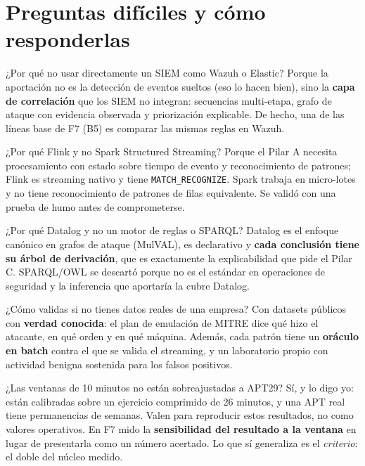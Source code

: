 \documentclass[11pt,a4paper]{article}
\newcommand{\cod}[1]{\texttt{#1}}
\begin{document}
\newpage
\section{Preguntas difíciles y cómo responderlas}\label{sec:preguntas}

\begin{pregunta}{¿Por qué no usar directamente un SIEM como Wazuh o Elastic?}
Porque la aportación no es la detección de eventos sueltos (eso lo hacen bien), sino la \textbf{capa de
correlación} que los SIEM no integran: secuencias multi-etapa, grafo de ataque con evidencia observada y
priorización explicable. De hecho, una de las líneas base de F7 (B5) es comparar las mismas reglas en Wazuh.
\end{pregunta}

\begin{pregunta}{¿Por qué Flink y no Spark Structured Streaming?}
Porque el Pilar A necesita procesamiento con estado sobre tiempo de evento y reconocimiento de patrones; Flink es
streaming nativo y tiene \cod{MATCH\_RECOGNIZE}. Spark trabaja en micro-lotes y no tiene reconocimiento de patrones de
filas equivalente. Se validó con una prueba de humo antes de comprometerse.
\end{pregunta}

\begin{pregunta}{¿Por qué Datalog y no un motor de reglas o SPARQL?}
Datalog es el enfoque canónico en grafos de ataque (MulVAL), es declarativo y \textbf{cada conclusión tiene su árbol
de derivación}, que es exactamente la explicabilidad que pide el Pilar C. SPARQL/OWL se descartó porque no es el
estándar en operaciones de seguridad y la inferencia que aportaría la cubre Datalog.
\end{pregunta}

\begin{pregunta}{¿Cómo validas si no tienes datos reales de una empresa?}
Con datasets públicos con \textbf{verdad conocida}: el plan de emulación de MITRE dice qué hizo el atacante, en qué
orden y en qué máquina. Además, cada patrón tiene un \textbf{oráculo en batch} contra el que se valida el streaming,
y un laboratorio propio con actividad benigna sostenida para los falsos positivos.
\end{pregunta}

\begin{pregunta}{¿Las ventanas de 10 minutos no están sobreajustadas a APT29?}
Sí, y lo digo yo: están calibradas sobre un ejercicio comprimido de 26 minutos, y una APT real tiene permanencias
de semanas. Valen para reproducir estos resultados, no como valores operativos. En F7 mido la
\textbf{sensibilidad del resultado a la ventana} en lugar de presentarla como un número acertado. Lo que sí
generaliza es el \textit{criterio}: el doble del núcleo medido.
\end{pregunta}
\end{document}

